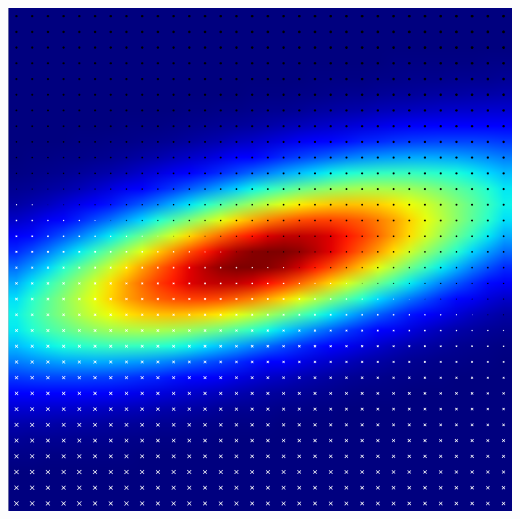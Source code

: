 \documentclass[slidestop,compress,mathserif,color,12pt]{beamer}
\begin{document}
\begin{frame}
\begin{minipage}{0.39\linewidth}
{\centerline{\includegraphics[width=0.7\linewidth]{comp.png}}}
\end{minipage}
\end{frame}
\end{document}
